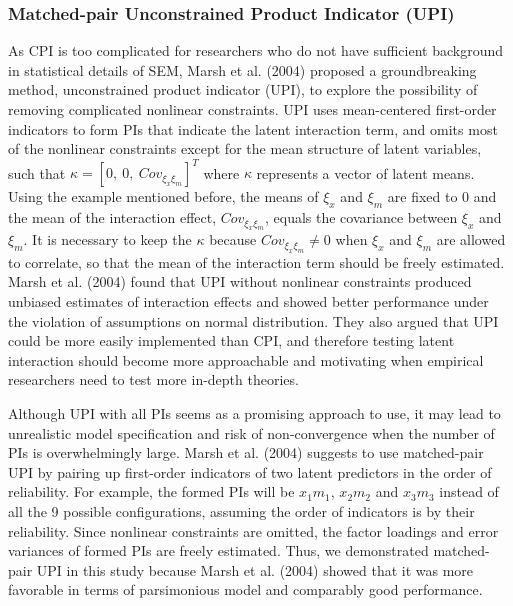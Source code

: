 \documentclass[
  man]{apa7}
\begin{document}
\hypertarget{matched-pair-unconstrained-product-indicator-upi}{%
\subsubsection{Matched-pair Unconstrained Product Indicator (UPI)}\label{matched-pair-unconstrained-product-indicator-upi}}

As CPI is too complicated for researchers who do not have sufficient background in statistical details of SEM, Marsh et al. (2004) proposed a groundbreaking method, unconstrained product indicator (UPI), to explore the possibility of removing complicated nonlinear constraints. UPI uses mean-centered first-order indicators to form PIs that indicate the latent interaction term, and omits most of the nonlinear constraints except for the mean structure of latent variables, such that \(\kappa = [0, \ 0, \ Cov_{\xi_{x}\xi_{m}}]^T\) where \(\kappa\) represents a vector of latent means. Using the example mentioned before, the means of \(\xi_{x}\) and \(\xi_{m}\) are fixed to 0 and the mean of the interaction effect, \(Cov_{\xi_{x}\xi_{m}}\), equals the covariance between \(\xi_{x}\) and \(\xi_{m}\). It is necessary to keep the \(\kappa\) because \(Cov_{\xi_{x}\xi_{m}} \neq 0\) when \(\xi_{x}\) and \(\xi_{m}\) are allowed to correlate, so that the mean of the interaction term should be freely estimated. Marsh et al. (2004) found that UPI without nonlinear constraints produced unbiased estimates of interaction effects and showed better performance under the violation of assumptions on normal distribution. They also argued that UPI could be more easily implemented than CPI, and therefore testing latent interaction should become more approachable and motivating when empirical researchers need to test more in-depth theories.

Although UPI with all PIs seems as a promising approach to use, it may lead to unrealistic model specification and risk of non-convergence when the number of PIs is overwhelmingly large. Marsh et al. (2004) suggests to use matched-pair UPI by pairing up first-order indicators of two latent predictors in the order of reliability. For example, the formed PIs will be \(x_{1}m_{1}\), \(x_{2}m_{2}\) and \(x_{3}m_{3}\) instead of all the 9 possible configurations, assuming the order of indicators is by their reliability. Since nonlinear constraints are omitted, the factor loadings and error variances of formed PIs are freely estimated. Thus, we demonstrated matched-pair UPI in this study because Marsh et al. (2004) showed that it was more favorable in terms of parsimonious model and comparably good performance.
\end{document}
